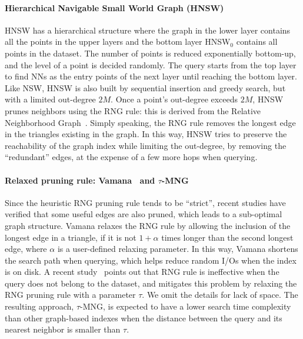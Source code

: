 \documentclass[11pt]{article}
\begin{document}
\paragraph{Hierarchical Navigable Small World Graph (HNSW)~\cite{hnsw}}
HNSW has a hierarchical structure where the graph in the lower layer contains all the points in the upper layers and the bottom layer HNSW$_0$ contains all points in the dataset.
The number of points is reduced exponentially bottom-up, and the level of a point is decided randomly.
The query starts from the top layer to find NNs as the entry points of the next layer until reaching the bottom layer.
Like NSW, HNSW is also built by sequential insertion and greedy search, but with a limited out-degree $2M$.
Once a point's out-degree exceeds $2M$, HNSW prunes neighbors using the RNG rule: this is derived from the Relative Neighborhood Graph~\cite{rng}.
Simply speaking, the RNG rule removes the longest edge in the triangles existing in the graph.
In this way, HNSW tries to preserve the reachability of the graph index while limiting the out-degree, by removing the ``redundant'' edges, at the expense of a few more hops when querying.

\paragraph{Relaxed pruning rule: Vamana~\cite{diskann} and $\tau$-MNG~\cite{tau}}
Since the heuristic RNG pruning rule tends to be ``strict'', recent studies have verified that some useful edges are also pruned, which leads to a sub-optimal graph structure.
Vamana relaxes the RNG rule by allowing the inclusion of the longest edge in a triangle, if it is not $1+\alpha$ times longer than the second longest edge, where $\alpha$ is a user-defined relaxing parameter.
In this way, Vamana shortens the search path when querying, which helps reduce random I/Os when the index is on disk.
A recent study~\cite{tau} points out that RNG rule is ineffective when the query does not belong to the dataset, and mitigates this problem by relaxing the RNG pruning rule with a parameter $\tau$.
We omit the details for lack of space.
The resulting approach, $\tau$-MNG, is expected to have a lower search time complexity than other graph-based indexes when the distance between the query and its nearest neighbor is smaller than $\tau$. 
\end{document}
